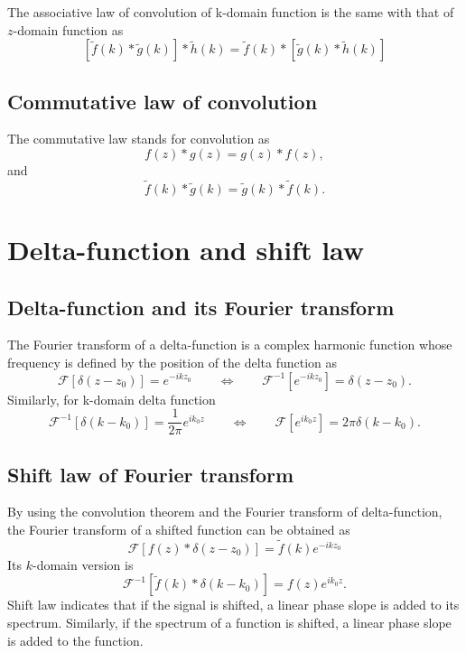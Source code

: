 \documentclass[a4paper]{article}
\newcommand{\ftf}[1]{{\mathcal{F}\left[#1\right]\xspace}}
\newcommand{\iftf}[1]{{\mathcal{F}^{-1}\left[#1\right]\xspace}}
\newcommand{\ftt}[1]{{\tilde{#1}\xspace}}
\begin{document}
The associative law of convolution of k-domain function is the same with that of $z$-domain function as
\begin{equation}
	\left[\ftt{f}(k)*\ftt{g}(k)\right]*\ftt{h}(k) = \ftt{f}(k) * \left[\ftt{g}(k)*\ftt{h}(k)\right]
\end{equation}

\subsection*{Commutative law of convolution}
The commutative law stands for convolution as
\begin{equation}
	f(z) * g(z) = g(z) * f(z),
\end{equation}
and
\begin{equation}
	\ftt{f}(k) * \ftt{g}(k) = \ftt{g}(k) * \ftt{f}(k).
\end{equation}

\section{Delta-function and shift law}
\subsection*{Delta-function and its Fourier transform}
The Fourier transform of a delta-function is a complex harmonic function whose frequency is defined by the position of the delta function as
\begin{equation}
	\ftf{\delta\left(z-z_0\right)} = e^{-i k z_0}
	\qquad\Leftrightarrow\qquad	
	\iftf{e^{-ikz_0}} = \delta\left(z-z_0\right).
\end{equation}
Similarly, for k-domain delta function
\begin{equation}
	\label{eq:deltaK}
	\iftf{\delta\left(k-k_0\right)} = \frac{1}{2\pi} e^{i k_0 z}
	\qquad\Leftrightarrow\qquad
	\ftf{e^{i k_0 z}} = 2\pi\delta\left(k-k_0\right).
\end{equation}

\subsection*{Shift law of Fourier transform}
By using the convolution theorem and the Fourier transform of delta-function, the Fourier transform of a shifted function can be obtained as
\begin{equation}
	\ftf{ f(z) * \delta\left(z-z_0\right)} = \ftt{f}(k) e^{-ikz_0}
\end{equation}
Its $k$-domain version is
\begin{equation}
	\iftf{\ftt{f}(k)* \delta\left(k-k_0\right)} = f(z) e^{ik_0z}.
\end{equation}
Shift law indicates that if the signal is shifted, a linear phase slope is added to its spectrum.
Similarly, if the spectrum of a function is shifted, a linear phase slope is added to the function.
\end{document}

